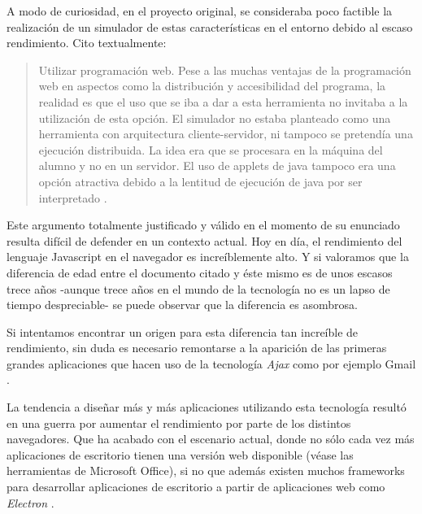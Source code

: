 A modo de curiosidad, en el proyecto original, se consideraba poco factible la realización de 
un simulador de estas características en el entorno debido al escaso rendimiento. Cito textualmente:

\begin{quotation}
Utilizar programación web. Pese a las muchas ventajas de la programación
web en aspectos como la distribución y accesibilidad del programa, la realidad
es que el uso que se iba a dar a esta herramienta no invitaba a la utilización de
esta opción. El simulador no estaba planteado como una herramienta con
arquitectura cliente-servidor, ni tampoco se pretendía una ejecución distribuida.
La idea era que se procesara en la máquina del alumno y no en un servidor. El
uso de applets de java tampoco era una opción atractiva debido a la lentitud de
ejecución de java por ser interpretado \cite{SIMDE}.
\end{quotation}

\bigskip
Este argumento totalmente justificado y válido en el momento de su enunciado
resulta difícil de defender en un contexto actual. Hoy en día, el rendimiento del lenguaje 
Javascript en el navegador es increíblemente alto. Y si valoramos que 
la diferencia de edad entre el documento citado y éste mismo es de unos escasos trece años -aunque 
trece años en el mundo de la tecnología no es un lapso de tiempo despreciable- se puede observar
que la diferencia es asombrosa.
 
\bigskip
Si intentamos encontrar un origen para esta diferencia tan increíble de rendimiento, sin duda
es necesario remontarse a la aparición de las primeras grandes aplicaciones que hacen uso de la tecnología
\textit{Ajax} como por ejemplo Gmail \cite{EvolutionJavascript}.

\bigskip
La tendencia a diseñar más y más aplicaciones utilizando esta tecnología resultó en una guerra por aumentar el rendimiento por parte de los distintos navegadores. Que ha 
acabado con el escenario actual, donde no sólo cada vez más aplicaciones de escritorio tienen una versión web 
disponible (véase las herramientas de Microsoft Office), si no que además existen muchos frameworks para 
desarrollar aplicaciones de escritorio a partir de aplicaciones web como \textit{Electron} \cite{Electron}.
